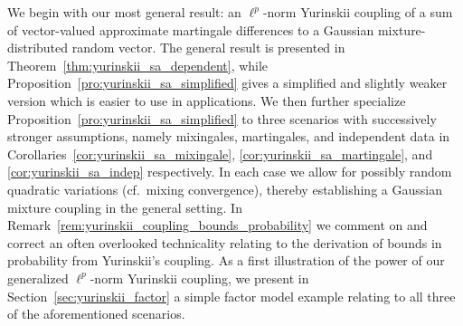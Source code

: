 \documentclass[11pt,lof]{puthesis}
\theoremstyle{break}
\theoremstyle{proof}
\begin{document}
We begin with our most general result: an $\ell^p$-norm Yurinskii coupling of a
sum of vector-valued approximate martingale differences to a Gaussian
mixture-distributed random vector. The general result is presented in
Theorem~\ref{thm:yurinskii_sa_dependent}, while
Proposition~\ref{pro:yurinskii_sa_simplified} gives
a simplified and slightly weaker version which is easier to use in
applications. We then further specialize
Proposition~\ref{pro:yurinskii_sa_simplified} to
three scenarios with successively stronger assumptions, namely mixingales,
martingales, and independent data in
Corollaries~\ref{cor:yurinskii_sa_mixingale},
\ref{cor:yurinskii_sa_martingale}, and \ref{cor:yurinskii_sa_indep}
respectively. In each case we
allow for possibly random quadratic variations (cf.\ mixing convergence),
thereby establishing a Gaussian mixture coupling in the general setting. In
Remark~\ref{rem:yurinskii_coupling_bounds_probability} we comment on and
correct an often
overlooked technicality relating to the derivation of bounds in probability
from Yurinskii's coupling. As a first illustration of the power of our
generalized $\ell^p$-norm Yurinskii coupling, we present in
Section~\ref{sec:yurinskii_factor} a simple factor model example relating to
all three of the aforementioned scenarios.
\end{document}
